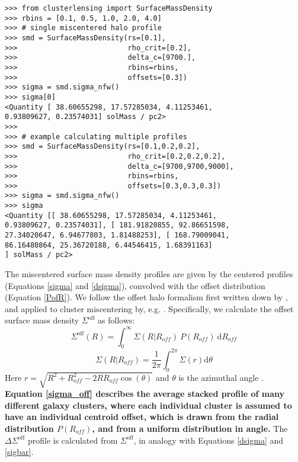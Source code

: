 \documentclass[twocolumn]{aastex6}
\begin{document}
\begin{verbatim}
>>> from clusterlensing import SurfaceMassDensity
>>> rbins = [0.1, 0.5, 1.0, 2.0, 4.0]
>>> # single miscentered halo profile
>>> smd = SurfaceMassDensity(rs=[0.1],
>>>                          rho_crit=[0.2],
>>>                          delta_c=[9700.],
>>>                          rbins=rbins,
>>>                          offsets=[0.3])
>>> sigma = smd.sigma_nfw()
>>> sigma[0]
<Quantity [ 38.60655298, 17.57285034, 4.11253461,
0.93809627, 0.23574031] solMass / pc2>
>>> 
>>> # example calculating multiple profiles
>>> smd = SurfaceMassDensity(rs=[0.1,0.2,0.2],
>>>                          rho_crit=[0.2,0.2,0.2],
>>>                          delta_c=[9700,9700,9000],
>>>                          rbins=rbins,
>>>                          offsets=[0.3,0.3,0.3])
>>> sigma = smd.sigma_nfw()
>>> sigma
<Quantity [[ 38.60655298, 17.57285034, 4.11253461, 
0.93809627, 0.23574031], [ 181.91820855, 92.86651598, 
27.34020647, 6.94677803, 1.81488253], [ 168.79009041, 
86.16480864, 25.36720188, 6.44546415, 1.68391163]
] solMass / pc2>
\end{verbatim}

The miscentered surface mass density profiles are given by the centered profiles (Equations \ref{sigma} and \ref{dsigma}), convolved with the offset distribution (Equation \ref{PofR}). We follow the offset halo formalism first written down by \citet{Yang06}, and applied to cluster miscentering by, e.g. \citet{Johnston07, George12, Ford14, Ford15, Simet16}. Specifically, we calculate the offset surface mass density $\Sigma^\mathrm{off}$ as follows:
\begin{equation}\label{sigma_off}
\Sigma^\mathrm{off}(R) = \int_{0}^{\infty} \Sigma(R | R_{off})\ P(R_{off})\  \mathrm{d}R_{off}
\end{equation}
\begin{equation}\label{sigma_RgivenRoff}
\Sigma(R|R_{off})=\frac{1}{2\pi}\int_{0}^{2\pi}\Sigma(r) \mathrm{d}\theta
\end{equation}
Here $r = \sqrt{R^2+R_{off}^2-2RR_{off}\cos(\theta)}$ and $\theta$ is the azimuthal angle \citep{Yang06}. {\bf Equation \ref{sigma_off} describes the average stacked profile of many different galaxy clusters, where each individual cluster is assumed to have an individual centroid offset, which is drawn from the radial distribution $P(R_{off})$, and from a uniform distribution in angle.} The $\Delta\Sigma^\mathrm{off}$ profile is calculated from $\Sigma^\mathrm{off}$, in analogy with Equations \ref{dsigma} and \ref{sigbar}.
\end{document}
